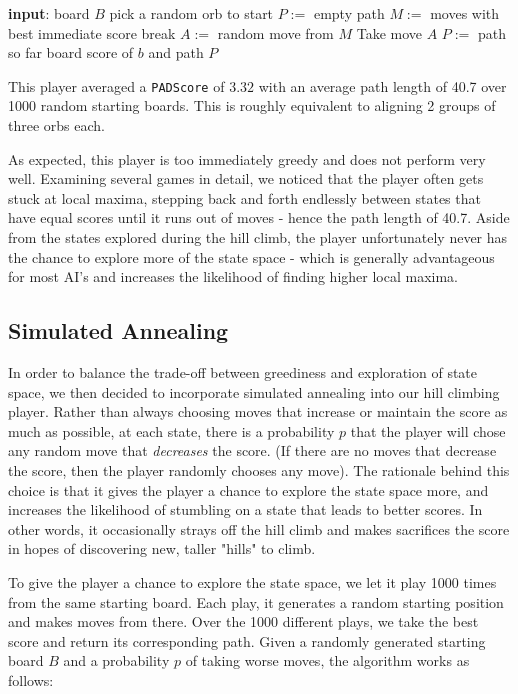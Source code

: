 \documentclass[journal,final,letterpaper,11pt]{IEEEtran}
\begin{document}
\begin{algorithmic}[1]
\STATE \textbf{input}: board $B$
\STATE pick a random orb to start
\STATE $P :=$ empty path
  \STATE $M :=$ moves with best immediate score
    \STATE break
  \ENDIF
  \STATE $A :=$ random move from $M$
  \STATE Take move $A$
  \STATE $P :=$ path so far
\ENDFOR
\RETURN board score of $b$ and path $P$
\end{algorithmic}

This player averaged a \texttt{PADScore} of $3.32$ with an average path length of 40.7 over 1000 random starting boards. This is roughly equivalent to aligning 2 groups of three orbs each. 

As expected, this player is too immediately greedy and does not perform very well. Examining several games in detail, we noticed that the player often gets stuck at local maxima, stepping back and forth endlessly between states that have equal scores until it runs out of moves - hence the path length of 40.7. Aside from the states explored during the hill climb, the player unfortunately never has the chance to explore more of the state space - which is generally advantageous for most AI's and increases the likelihood of finding higher local maxima.

\subsection{Simulated Annealing}
In order to balance the trade-off between greediness and exploration of state space, we then decided to incorporate simulated annealing into our hill climbing player. Rather than always choosing moves that increase or maintain the score as much as possible, at each state, there is a probability $p$ that the player will chose any random move that \textit{decreases} the score. (If there are no moves that decrease the score, then the player randomly chooses any move). The rationale behind this choice is that it gives the player a chance to explore the state space more, and increases the likelihood of stumbling on a state that leads to better scores. In other words, it occasionally strays off the hill climb and makes sacrifices the score in hopes of discovering new, taller "hills" to climb. 

To give the player a chance to explore the state space, we let it play 1000 times from the same starting board. Each play, it generates a random starting position and makes moves from there. Over the 1000 different plays, we take the best score and return its corresponding path. Given a randomly generated starting board $B$ and a probability $p$ of taking worse moves, the algorithm works as follows:
\end{document}
